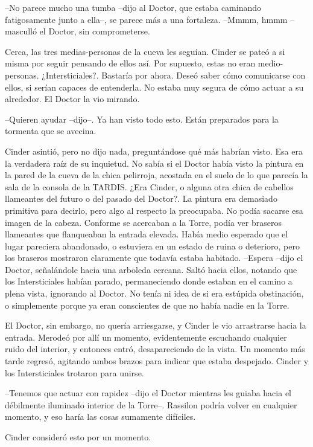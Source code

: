--No parece mucho una tumba --dijo al Doctor, que estaba caminando fatigosamente junto a ella--, se parece más a una fortaleza.
--Mmmm, hmmm --masculló el Doctor, sin comprometerse.

Cerca, las tres medias-personas de la cueva les seguían. Cinder se pateó a si misma por seguir pensando de ellos así. Por supuesto, estas no eran medio-personas. ¿Intersticiales?. Bastaría por ahora.
Deseó saber cómo comunicarse con ellos, si serían capaces de entenderla. No estaba muy segura de cómo actuar a su alrededor.
El Doctor la vio mirando. 

--Quieren ayudar --dijo--. Ya han visto todo esto. Están preparados para la tormenta que se avecina.

Cinder asintió, pero no dijo nada, preguntándose qué más habrían visto. Esa era la verdadera raíz de su inquietud. No sabía si el Doctor había visto la pintura en la pared de la cueva de la chica pelirroja, acostada en el suelo de lo que parecía la sala de la consola de la TARDIS. ¿Era Cinder, o alguna otra chica de cabellos llameantes del futuro o del pasado del Doctor?. La pintura era demasiado primitiva para decirlo, pero algo al respecto la preocupaba. No podía sacarse esa imagen de la cabeza.
Conforme se acercaban a la Torre, podía ver braseros llameantes que flanqueaban la entrada elevada. Había medio esperado que el lugar pareciera abandonado, o estuviera en un estado de ruina o deterioro, pero los braseros mostraron claramente que todavía estaba habitado.
--Espera --dijo el Doctor, señalándole hacia una arboleda cercana. Saltó hacia ellos, notando que los Intersticiales habían parado, permaneciendo donde estaban en el camino a plena vista, ignorando al Doctor. No tenía ni idea de si era estúpida obstinación, o simplemente porque ya eran conscientes de que no había nadie en la Torre.

El Doctor, sin embargo, no quería arriesgarse, y Cinder le vio arrastrarse hacia la entrada. Merodeó por allí un momento, evidentemente escuchando cualquier ruido del interior, y entonces entró, desapareciendo de la vista.
Un momento más tarde regresó, agitando ambos brazos para indicar que estaba despejado.
Cinder y los Intersticiales trotaron para unirse.

--Tenemos que actuar con rapidez --dijo el Doctor mientras les guiaba hacia el débilmente iluminado interior de la Torre--. Rassilon podría volver en cualquier momento, y eso haría las cosas sumamente difíciles.

Cinder consideró esto por un momento. 

